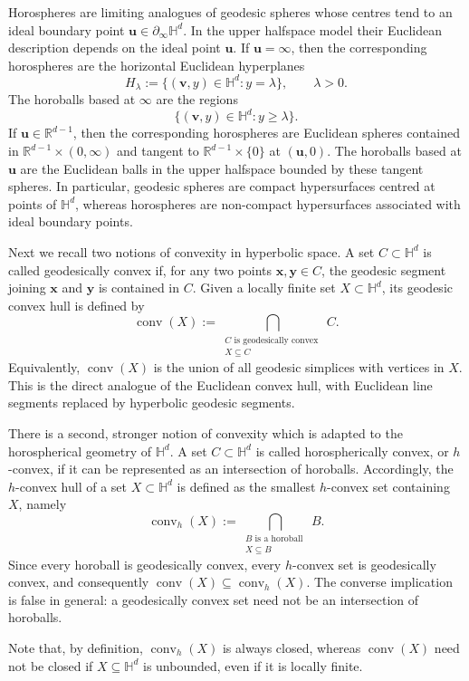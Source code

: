 \documentclass[11pt,a4paper]{article}
\theoremstyle{plain}
\theoremstyle{definition}
\theoremstyle{remark}
\newcommand{\bx}{\boldsymbol{x}}
\newcommand{\by}{\boldsymbol{y}}
\newcommand{\bu}{\boldsymbol{u}}
\newcommand{\bv}{\boldsymbol{v}}
\def\HH{\mathbb{H}}
\def\RR{\mathbb{R}}
\newcommand{\conv}{\mathop{\mathrm{conv}}\nolimits}
\begin{document}
Horospheres are limiting analogues of geodesic spheres whose centres tend to
an ideal boundary point $\bu\in\partial_\infty\HH^d$. In the upper halfspace model their Euclidean
description depends on the ideal point $\bu$. If $\bu=\infty$, then the
corresponding horospheres are the horizontal Euclidean hyperplanes
\[
	H_\lambda:=\{(\bv,y)\in\HH^d:y=\lambda\},
	\qquad \lambda>0.
\]
The horoballs based at $\infty$ are the regions
\[
	\{(\bv,y)\in\HH^d:y\ge \lambda\}.
\]
If $\bu\in\RR^{d-1}$, then the corresponding horospheres are Euclidean
spheres contained in $\RR^{d-1}\times(0,\infty)$ and tangent to
$\RR^{d-1}\times\{0\}$ at $(\bu,0)$. The horoballs based at $\bu$ are the
Euclidean balls in the upper halfspace bounded by these tangent spheres. In particular, geodesic spheres are compact hypersurfaces centred at points of
$\HH^d$, whereas horospheres are non-compact hypersurfaces associated with
ideal boundary points.


Next we recall two notions of convexity in hyperbolic space. A set
$C\subset\HH^d$ is called geodesically convex if, for any two points
$\bx,\by\in C$, the geodesic segment joining $\bx$ and $\by$ is
contained in $C$. Given a locally finite set $X\subset\HH^d$, its
geodesic convex hull is defined by
\[
	\conv(X)
	:=
	\bigcap_{\substack{C \text{ is geodesically convex }\\X\subseteq C}}C.
\]
Equivalently, $\conv(X)$ is the union of all geodesic simplices with
vertices in $X$. This is the direct analogue of the Euclidean convex hull,
with Euclidean line segments replaced by hyperbolic geodesic segments.

There is a second, stronger notion of convexity which is adapted to the
horospherical geometry of $\HH^d$. A set $C\subset\HH^d$ is called
horospherically convex, or $h$-convex, if it can be represented as an
intersection of horoballs. Accordingly, the $h$-convex hull of a set $X\subset\HH^d$ is defined as the smallest $h$-convex set containing $X$, namely
\[
	\conv_h(X)
	:=
	\bigcap_{\substack{B \text{ is a horoball }\\X\subseteq B}}B.
\]
Since every horoball is geodesically convex, every $h$-convex set is
geodesically convex, and consequently $\conv(X)\subseteq \conv_h(X)$.
The converse implication is false in general: a geodesically convex set need
not be an intersection of horoballs.


Note that, by definition, $\conv_h(X)$ is always closed, whereas $\conv(X)$ need not be closed if $X\subseteq\HH^d$ is unbounded, even if it is locally finite.
\end{document}
